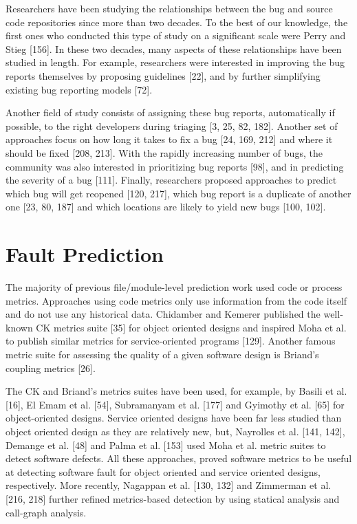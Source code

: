 \documentclass[12pt]{report}
\begin{document}
Researchers have been studying the relationships between the bug and
source code repositories since more than two decades. To the best of our
knowledge, the first ones who conducted this type of study on a
significant scale were Perry and Stieg {[}156{]}. In these two decades,
many aspects of these relationships have been studied in length. For
example, researchers were interested in improving the bug reports
themselves by proposing guidelines {[}22{]}, and by further simplifying
existing bug reporting models {[}72{]}.

Another field of study consists of assigning these bug reports,
automatically if possible, to the right developers during triaging {[}3,
25, 82, 182{]}. Another set of approaches focus on how long it takes to
fix a bug {[}24, 169, 212{]} and where it should be fixed {[}208,
213{]}. With the rapidly increasing number of bugs, the community was
also interested in prioritizing bug reports {[}98{]}, and in predicting
the severity of a bug {[}111{]}. Finally, researchers proposed
approaches to predict which bug will get reopened {[}120, 217{]}, which
bug report is a duplicate of another one {[}23, 80, 187{]} and which
locations are likely to yield new bugs {[}100, 102{]}.

\section{Fault Prediction}\label{fault-prediction}

The majority of previous file/module-level prediction work used code or
process metrics. Approaches using code metrics only use information from
the code itself and do not use any historical data. Chidamber and
Kemerer published the well-known CK metrics suite {[}35{]} for object
oriented designs and inspired Moha et al. to publish similar metrics for
service-oriented programs {[}129{]}. Another famous metric suite for
assessing the quality of a given software design is Briand's coupling
metrics {[}26{]}.

The CK and Briand's metrics suites have been used, for example, by
Basili et al. {[}16{]}, El Emam et al. {[}54{]}, Subramanyam et al.
{[}177{]} and Gyimothy et al. {[}65{]} for object-oriented designs.
Service oriented designs have been far less studied than object oriented
design as they are relatively new, but, Nayrolles et al. {[}141, 142{]},
Demange et al. {[}48{]} and Palma et al. {[}153{]} used Moha et al.
metric suites to detect software defects. All these approaches, proved
software metrics to be useful at detecting software fault for object
oriented and service oriented designs, respectively. More recently,
Nagappan et al. {[}130, 132{]} and Zimmerman et al. {[}216, 218{]}
further refined metrics-based detection by using statical analysis and
call-graph analysis.
\end{document}
